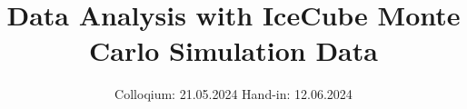 

\subject{Advanced Laboratory course}
\title{Data Analysis with IceCube Monte Carlo Simulation Data}
\date{%
  Colloqium: 21.05.2024
  \hspace{3em}
  Hand-in: 12.06.2024
}

\newcommand\barparen[1]{\overset{(-)}{#1}}



\maketitle
\thispagestyle{empty}
\tableofcontents
\newpage






\printbibliography{}


